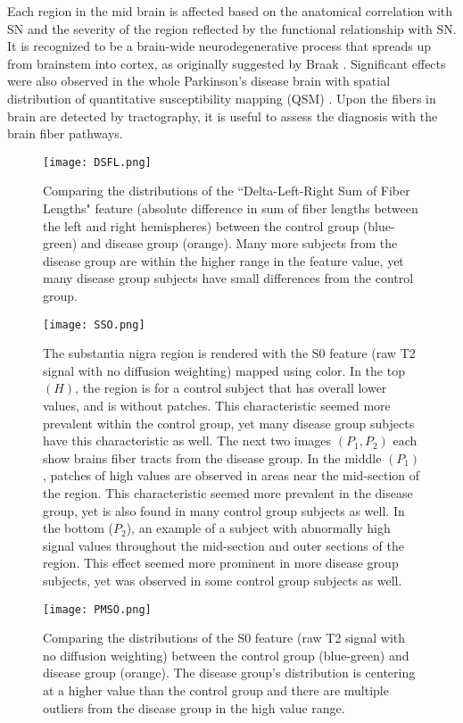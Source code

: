 Each region in the mid brain is affected based on the anatomical correlation with SN and the severity of the region reflected by the functional relationship with SN\cite{zeighami2015network}. It is recognized to be a brain-wide neurodegenerative process that spreads up from brainstem into cortex, as originally suggested by Braak \cite{yau2018network}. Significant effects were also observed in the whole Parkinson's disease brain with spatial distribution of quantitative susceptibility mapping (QSM) \cite{atkinson2017diffusion}. Upon the fibers in brain are detected by tractography, it is useful to assess the diagnosis with the brain fiber pathways. 

\begin{figure}[!ht]
\centering
\texttt{[image: DSFL.png]}
\caption{Comparing the distributions of the ``Delta-Left-Right Sum of Fiber Lengths" feature (absolute difference in sum of fiber lengths between the left and right hemispheres) between the control group (blue-green) and disease group (orange). Many more subjects from the disease group are within the higher range in the feature value, yet many disease group subjects have small differences from the control group.}
\label{fig:DSFL}
\end{figure}

\begin{figure}[!ht]
\centering
\texttt{[image: SSO.png]}
\caption{The substantia nigra region is rendered with the S0 feature (raw T2 signal with no diffusion weighting) mapped using color. In the top $(H)$, the region is for a control subject that has overall lower values, and is without patches. This characteristic seemed more prevalent within the control group, yet many disease group subjects have this characteristic as well. The next two images $(P_1, P_2)$ each show brains fiber tracts from the disease group. In the middle $(P_1)$, patches of high values are observed in areas near the mid-section of the region. This characteristic seemed more prevalent in the disease group, yet is also found in many control group subjects as well. In the bottom ($P_2$), an example of a subject with abnormally high signal values throughout the mid-section and outer sections of the region. This effect seemed more prominent in more disease group subjects, yet was observed in some control group subjects as well.}
\label{fig:SSO}
\end{figure}


\begin{figure}[!ht]
\centering
\texttt{[image: PMSO.png]}
\caption{Comparing the distributions of the S0 feature (raw T2 signal with no diffusion weighting) between the control group (blue-green) and disease group (orange). The disease group's distribution is centering at a higher value than the control group and there are multiple outliers from the disease group in the high value range.}
\label{fig:PMSO}
\end{figure}

